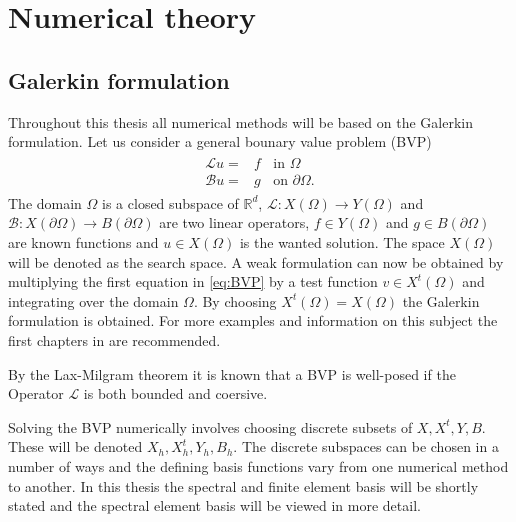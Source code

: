 
\chapter{Numerical theory} %

\label{theory} %



\section{Galerkin formulation}
Throughout this thesis all numerical methods will be based on the Galerkin formulation. Let us consider a general bounary value problem (BVP)
\begin{align}
	\begin{split}
	\mathcal{L}u =& f \;\; \text{ in } \Omega\\
	\mathcal{B}u =& g \;\; \text{ on } \partial\Omega.
	\end{split}
	\label{eq:BVP}
\end{align}
The domain $\Omega$ is a closed subspace of $\mathbb{R}^d$, $\mathcal{L}: X(\Omega)\rightarrow Y(\Omega)$ and $\mathcal{B}: X(\partial\Omega)\rightarrow B(\partial\Omega)$ are two linear operators,
$f\in Y(\Omega)$ and $g\in B(\partial\Omega)$ are known functions and $u \in X(\Omega)$ is the wanted solution. 
The space $X(\Omega)$ will be denoted as the search space. A weak formulation can now be obtained by multiplying the first equation in \ref{eq:BVP} 
by a test function $v \in X^t(\Omega)$ and integrating over the domain $\Omega$. By choosing $X^t(\Omega) = X(\Omega)$ the Galerkin formulation is obtained.
For more examples and information on this subject the first chapters in \cite{Quarteroni} are recommended. 

By the Lax-Milgram theorem it is known that a BVP is well-posed if the Operator $\mathcal{L}$ is both bounded and coersive.   

Solving the BVP numerically involves choosing discrete subsets of $X,X^t,Y,B$. These will be denoted $X_h,X_h^t,Y_h,B_h$.
The discrete subspaces can be chosen in a number of ways and the defining basis functions vary from one numerical method to another. 
In this thesis the spectral and finite element basis will be shortly stated and the spectral element basis will be viewed in more detail.


